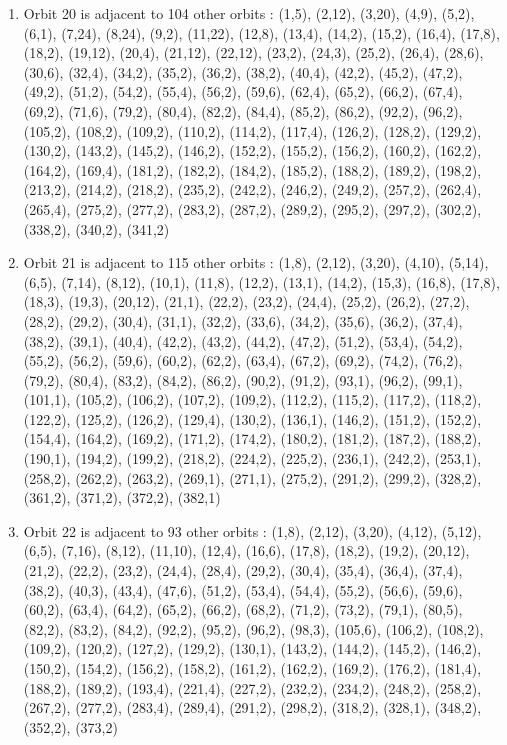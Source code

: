 \documentclass[12pt]{article}
\begin{document}
\begin{enumerate}
\item Orbit 20 is adjacent to 104 other orbits : (1,5), (2,12), (3,20), (4,9), (5,2), (6,1), (7,24), (8,24), (9,2), (11,22), (12,8), (13,4), (14,2), (15,2), (16,4), (17,8), (18,2), (19,12), (20,4), (21,12), (22,12), (23,2), (24,3), (25,2), (26,4), (28,6), (30,6), (32,4), (34,2), (35,2), (36,2), (38,2), (40,4), (42,2), (45,2), (47,2), (49,2), (51,2), (54,2), (55,4), (56,2), (59,6), (62,4), (65,2), (66,2), (67,4), (69,2), (71,6), (79,2), (80,4), (82,2), (84,4), (85,2), (86,2), (92,2), (96,2), (105,2), (108,2), (109,2), (110,2), (114,2), (117,4), (126,2), (128,2), (129,2), (130,2), (143,2), (145,2), (146,2), (152,2), (155,2), (156,2), (160,2), (162,2), (164,2), (169,4), (181,2), (182,2), (184,2), (185,2), (188,2), (189,2), (198,2), (213,2), (214,2), (218,2), (235,2), (242,2), (246,2), (249,2), (257,2), (262,4), (265,4), (275,2), (277,2), (283,2), (287,2), (289,2), (295,2), (297,2), (302,2), (338,2), (340,2), (341,2)
\item Orbit 21 is adjacent to 115 other orbits : (1,8), (2,12), (3,20), (4,10), (5,14), (6,5), (7,14), (8,12), (10,1), (11,8), (12,2), (13,1), (14,2), (15,3), (16,8), (17,8), (18,3), (19,3), (20,12), (21,1), (22,2), (23,2), (24,4), (25,2), (26,2), (27,2), (28,2), (29,2), (30,4), (31,1), (32,2), (33,6), (34,2), (35,6), (36,2), (37,4), (38,2), (39,1), (40,4), (42,2), (43,2), (44,2), (47,2), (51,2), (53,4), (54,2), (55,2), (56,2), (59,6), (60,2), (62,2), (63,4), (67,2), (69,2), (74,2), (76,2), (79,2), (80,4), (83,2), (84,2), (86,2), (90,2), (91,2), (93,1), (96,2), (99,1), (101,1), (105,2), (106,2), (107,2), (109,2), (112,2), (115,2), (117,2), (118,2), (122,2), (125,2), (126,2), (129,4), (130,2), (136,1), (146,2), (151,2), (152,2), (154,4), (164,2), (169,2), (171,2), (174,2), (180,2), (181,2), (187,2), (188,2), (190,1), (194,2), (199,2), (218,2), (224,2), (225,2), (236,1), (242,2), (253,1), (258,2), (262,2), (263,2), (269,1), (271,1), (275,2), (291,2), (299,2), (328,2), (361,2), (371,2), (372,2), (382,1)
\item Orbit 22 is adjacent to 93 other orbits : (1,8), (2,12), (3,20), (4,12), (5,12), (6,5), (7,16), (8,12), (11,10), (12,4), (16,6), (17,8), (18,2), (19,2), (20,12), (21,2), (22,2), (23,2), (24,4), (28,4), (29,2), (30,4), (35,4), (36,4), (37,4), (38,2), (40,3), (43,4), (47,6), (51,2), (53,4), (54,4), (55,2), (56,6), (59,6), (60,2), (63,4), (64,2), (65,2), (66,2), (68,2), (71,2), (73,2), (79,1), (80,5), (82,2), (83,2), (84,2), (92,2), (95,2), (96,2), (98,3), (105,6), (106,2), (108,2), (109,2), (120,2), (127,2), (129,2), (130,1), (143,2), (144,2), (145,2), (146,2), (150,2), (154,2), (156,2), (158,2), (161,2), (162,2), (169,2), (176,2), (181,4), (188,2), (189,2), (193,4), (221,4), (227,2), (232,2), (234,2), (248,2), (258,2), (267,2), (277,2), (283,4), (289,4), (291,2), (298,2), (318,2), (328,1), (348,2), (352,2), (373,2)

\end{enumerate}
\end{document}
